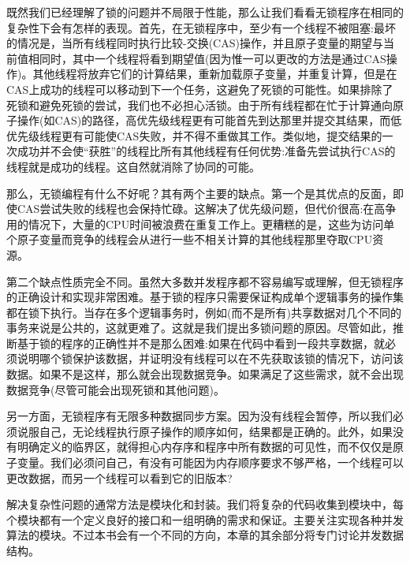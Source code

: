 既然我们已经理解了锁的问题并不局限于性能，那么让我们看看无锁程序在相同的复杂性下会有怎样的表现。首先，在无锁程序中，至少有一个线程不被阻塞:最坏的情况是，当所有线程同时执行比较-交换(CAS)操作，并且原子变量的期望与当前值相同时，其中一个线程将看到期望值(因为惟一可以更改的方法是通过CAS操作)。其他线程将放弃它们的计算结果，重新加载原子变量，并重复计算，但是在CAS上成功的线程可以移动到下一个任务，这避免了死锁的可能性。如果排除了死锁和避免死锁的尝试，我们也不必担心活锁。由于所有线程都在忙于计算通向原子操作(如CAS)的路径，高优先级线程更有可能首先到达那里并提交其结果，而低优先级线程更有可能使CAS失败，并不得不重做其工作。类似地，提交结果的一次成功并不会使“获胜”的线程比所有其他线程有任何优势:准备先尝试执行CAS的线程就是成功的线程。这自然就消除了协同的可能。

那么，无锁编程有什么不好呢？其有两个主要的缺点。第一个是其优点的反面，即使CAS尝试失败的线程也会保持忙碌。这解决了优先级问题，但代价很高:在高争用的情况下，大量的CPU时间被浪费在重复工作上。更糟糕的是，这些为访问单个原子变量而竞争的线程会从进行一些不相关计算的其他线程那里夺取CPU资源。

第二个缺点性质完全不同。虽然大多数并发程序都不容易编写或理解，但无锁程序的正确设计和实现非常困难。基于锁的程序只需要保证构成单个逻辑事务的操作集都在锁下执行。当存在多个逻辑事务时，例如(而不是所有)共享数据对几个不同的事务来说是公共的，这就更难了。这就是我们提出多锁问题的原因。尽管如此，推断基于锁的程序的正确性并不是那么困难:如果在代码中看到一段共享数据，就必须说明哪个锁保护该数据，并证明没有线程可以在不先获取该锁的情况下，访问该数据。如果不是这样，那么就会出现数据竞争。如果满足了这些需求，就不会出现数据竞争(尽管可能会出现死锁和其他问题)。

另一方面，无锁程序有无限多种数据同步方案。因为没有线程会暂停，所以我们必须说服自己，无论线程执行原子操作的顺序如何，结果都是正确的。此外，如果没有明确定义的临界区，就得担心内存序和程序中所有数据的可见性，而不仅仅是原子变量。我们必须问自己，有没有可能因为内存顺序要求不够严格，一个线程可以更改数据，而另一个线程可以看到它的旧版本?

解决复杂性问题的通常方法是模块化和封装。我们将复杂的代码收集到模块中，每个模块都有一个定义良好的接口和一组明确的需求和保证。主要关注实现各种并发算法的模块。不过本书会有一个不同的方向，本章的其余部分将专门讨论并发数据结构。




































